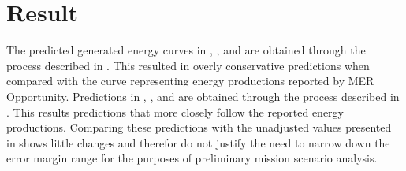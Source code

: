 \section{Result}
\label{sec:Appendix:NarrowedEnergyPredictionErrorMarginRange:Conclusion}

The predicted generated energy curves in , , and  are obtained through the process described in . This resulted in overly conservative predictions when compared with the curve representing energy productions reported by MER Opportunity. Predictions in , , and  are obtained through the process described in . This results predictions that more closely follow the reported energy productions. Comparing these predictions with the unadjusted values presented in  shows little changes and therefor do not justify the need to narrow down the error margin range for the purposes of preliminary mission scenario analysis.

